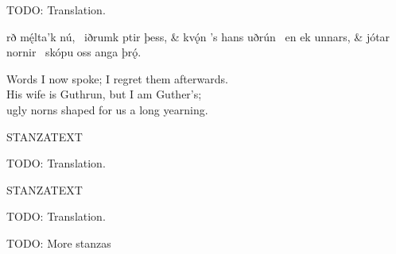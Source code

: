 \bvb TODO: Translation.\evb\evg


\bvg\bva%
rð mę́lta’k nú, \hld\ iðrumk ptir þess, &
kvǫ́n ’s hans uðrún \hld\ en ek unnars, &
jótar nornir \hld\ skópu oss anga þrǫ́.\eva

\bvb Words I now spoke; I regret them afterwards. \\
His wife is Guthrun, but I am Guther’s; \\
ugly norns shaped for us a long yearning.\evb\evg


\bvg\bva%
STANZATEXT\eva

\bvb TODO: Translation.\evb\evg


\bvg\bva%
STANZATEXT\eva

\bvb TODO: Translation.\evb\evg


TODO: More stanzas

\sectionline
